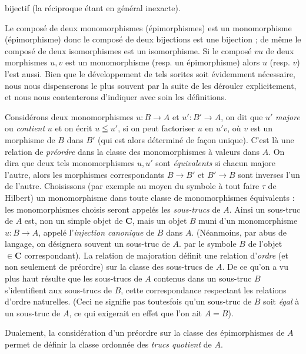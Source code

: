 
\noindent bijectif (la réciproque étant en général inexacte).

Le composé de deux monomorphismes (épimorphismes) est un monomorphisme
(épimorphisme) donc le composé de deux bijections est une bijection ; de même
le composé de deux isomorphismes est un isomorphisme. Si le composé $vu$ de
deux morphismes $u,v$ est un monomorphisme (resp. un épimorphisme) alors $u$
(resp. $v$) l'est aussi. Bien que le développement de tels sorites soit
évidemment nécessaire, nous nous dispenserons le plus souvent par la suite de
les dérouler explicitement, et nous nous contenterons d'indiquer avec soin les
définitions.

Considérons deux monomorphismes $u:B\to A$ et
$u':B'\to A$, on dit que $u'$ \textit{majore} ou \textit{contient} $u$ et
on écrit $u\leqq u'$, si on peut factoriser $u$ en $u'v$, où $v$ est un
morphisme de $B$ dans $B'$ (qui est alors déterminé de façon unique). C'est là
une relation de \textit{préordre} dans la classe des monomorphismes à valeurs
dans $A$. On dira que deux tels monomorphismes $u,u'$ sont
\textit{équivalents} si chacun majore l'autre, alors les morphismes
correspondants $B\to B'$ et $B'\to B$ sont inverses
l'un de l'autre. Choisissons (par exemple au moyen du symbole à tout faire
$\tau$ de Hilbert) un monomorphisme dans toute classe de monomorphismes
équivalents : les monomorphismes choisis seront appelés les
\textit{sous-trucs} de $A$. Ainsi un sous-truc de $A$ est, non un simple objet
de $\mathbf{C}$, mais un objet $B$ muni d'un monomorphisme $u:B\to A$,
appelé l'\textit{injection canonique} de $B$ dans $A$. (Néanmoins, par abus de
langage, on désignera souvent un sous-truc de $A$. par le symbole $B$ de
l'objet $\in\mathbf{C}$ correspondant). La relation de majoration définit une relation
d'\textit{ordre} (et non seulement de préordre) sur la classe des sous-trucs de
$A$. De ce qu'on a vu plus haut résulte que les sous-trucs de $A$ contenus dans
un sous-truc $B$ s'identifient aux sous-trucs de $B$, cette correspondance
respectant les relations d'ordre naturelles. (Ceci ne signifie pas toutesfois
qu'un sous-truc de $B$ soit \textit{égal} à un sous-truc de $A$, ce qui
exigerait en effet que l'on ait $A=B$).

Dualement, la considération d'un préordre sur la classe des épimorphismes de
$A$ permet de définir la classe ordonnée des \textit{trucs quotient} de $A$.

